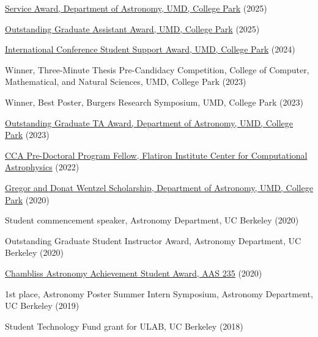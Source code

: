 \item[{\color{numcolor}\scriptsize13}] \href{https://www.astro.umd.edu/resources/internal/awards/dept/service.html}{Service Award, Department of Astronomy, UMD, College Park} (2025)


\item[{\color{numcolor}\scriptsize12}] \href{https://gradschool.umd.edu/sites/default/files/2025-05/OGA_AY24-25.pdf}{Outstanding Graduate Assistant Award, UMD, College Park} (2025)

\item[{\color{numcolor}\scriptsize11}] \href{https://gradschool.umd.edu/funding/student-fellowships-awards/graduate-school-travel-grants}{International Conference Student Support Award, UMD, College Park} (2024)

\item[{\color{numcolor}\scriptsize10}] Winner, Three-Minute Thesis Pre-Candidacy Competition, College of Computer, Mathematical, and Natural Sciences, UMD, College Park (2023)

\item[{\color{numcolor}\scriptsize9}] Winner, Best Poster, Burgers Research Symposium, UMD, College Park (2023)

\item[{\color{numcolor}\scriptsize8}] \href{https://www.astro.umd.edu/resources/internal/awards/dept/angerhofer.html}{Outstanding Graduate TA Award, Department of Astronomy, UMD, College Park} (2023)

\item[{\color{numcolor}\scriptsize7}] \href{https://www.simonsfoundation.org/flatiron-institute-center-for-computational-astrophysics-pre-doctoral-program/}{CCA Pre-Doctoral Program Fellow, Flatiron Institute Center for Computational Astrophysics} (2022)

\item[{\color{numcolor}\scriptsize6}] \href{https://www.astro.umd.edu/resources/internal/awards/dept/wentzel.html}{Gregor and Donat Wentzel Scholarship, Department of Astronomy, UMD, College Park} (2020)

\item[{\color{numcolor}\scriptsize5}] Student commencement speaker, Astronomy Department, UC Berkeley (2020)

\item[{\color{numcolor}\scriptsize4}] Outstanding Graduate Student Instructor Award, Astronomy Department, UC Berkeley (2020)

\item[{\color{numcolor}\scriptsize3}] \href{https://aas.org/grants-and-prizes/chambliss-astronomy-achievement-student-awards}{Chambliss Astronomy Achievement Student Award, AAS 235} (2020)

\item[{\color{numcolor}\scriptsize2}] 1st place, Astronomy Poster Summer Intern Symposium, Astronomy Department, UC Berkeley (2019)

\item[{\color{numcolor}\scriptsize1}] Student Technology Fund grant for ULAB, UC Berkeley (2018)
